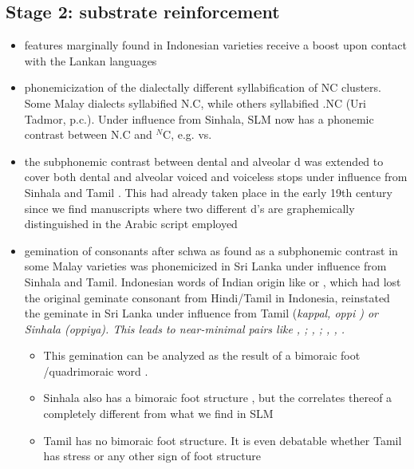 \documentclass[a4paper,12pt]{article}
\begin{document}
\subsection{Stage 2: substrate reinforcement}
\begin{itemize}
 \item features marginally found in Indonesian varieties receive a boost upon contact with the Lankan languages
 \item phonemicization of the dialectally different syllabification of NC clusters. Some Malay dialects syllabified N.C, while others syllabified .NC (Uri Tadmor, p.c.). Under influence from Sinhala, SLM now has a phonemic contrast between N.C and $^N$C, e.g.  vs.  \citep{Tapovanaye1995,ApoussidouEtAl2008,Nordhoff2009phd}
  \item the subphonemic contrast between dental \dentt{} and alveolar d was extended to cover both dental and alveolar voiced and voiceless stops under influence from Sinhala and Tamil \citep{Bichsel,Tapovanaye1995,Nordhoff2009phd}. This had already taken place in the early 19th century since we find manuscripts where two different d's are graphemically distinguished	in the Arabic script employed \citep{Hussainmiya1987}
  \item gemination of consonants after schwa as found as a subphonemic contrast in some Malay varieties was phonemicized in Sri Lanka under influence from Sinhala and Tamil. Indonesian words of Indian origin like  or , which had lost the original geminate consonant from Hindi/Tamil in Indonesia, reinstated the geminate in Sri Lanka under influence from Tamil (\em kappal, \dentt oppi \em) or Sinhala (\em \dentt oppiya\em). This leads to near-minimal pairs like , ; , ; , , .
  \begin{itemize}
    \item This gemination can be analyzed as the result of a bimoraic foot \citep{ApoussidouEtAl2008,Nordhoff2009phd}/quadrimoraic word \citep{Tapovanaye1995}.
    \item Sinhala also has a bimoraic foot structure \citep{Letterman1993}, but the correlates thereof a completely different from what we find in SLM
    \item Tamil has no bimoraic foot structure. It is even debatable whether Tamil has stress or any other sign of foot structure \citep{Keane2001}

\end{itemize}
\end{itemize}
\end{document}
